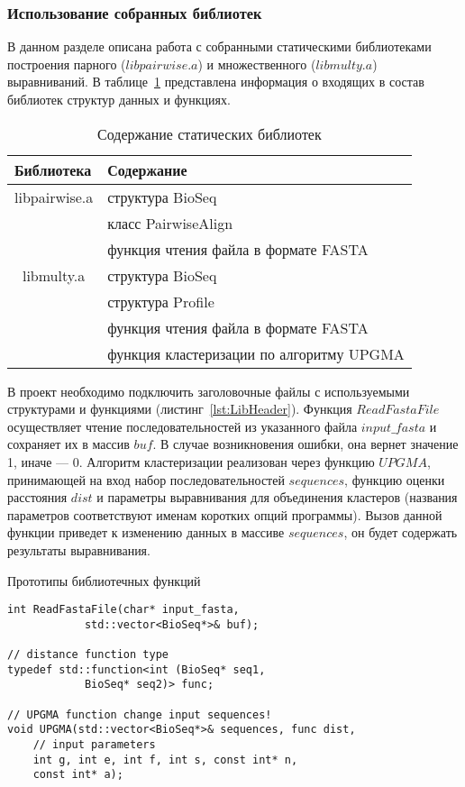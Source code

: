\subsubsection[Использование собранных библиотек]{\large Использование собранных библиотек}
\hspace{\parindent} В данном разделе описана работа с собранными статическими библиотеками построения парного ($libpairwise.a$) и множественного ($libmulty.a$) выравниваний. В таблице~\ref{tabular:staticlibs} представлена информация о входящих в состав библиотек структур данных и функциях.

\begin{table}[h]
\caption{Содержание статических библиотек}
\centering
\begin{tabular}{|l|l|}
\hline
Библиотека & Содержание \\ \hline
\multicolumn{ 1}{|c|}{libpairwise.a} & структура BioSeq \\ \cline{ 2- 2}
\multicolumn{ 1}{|l|}{} & класс PairwiseAlign \\ \cline{ 2- 2}
\multicolumn{ 1}{|l|}{} & функция чтения файла в формате FASTA \\ \hline
\multicolumn{ 1}{|c|}{libmulty.a} & структура BioSeq \\ \cline{ 2- 2}
\multicolumn{ 1}{|l|}{} & структура Profile \\ \cline{ 2- 2}
\multicolumn{ 1}{|l|}{} & функция чтения файла в формате FASTA \\ \cline{ 2- 2}
\multicolumn{ 1}{|l|}{} & функция кластеризации по алгоритму UPGMA \\ \hline
\end{tabular}
\label{tabular:staticlibs}
\end{table}

В проект необходимо подключить заголовочные файлы с используемыми структурами и функциями (листинг~\ref{lst:LibHeader}). Функция $ReadFastaFile$ осуществляет чтение последовательностей из указанного файла $input\_fasta$ и сохраняет их в массив $buf$. В случае возникновения ошибки, она вернет значение 1, иначе --- 0. Алгоритм кластеризации реализован через функцию $UPGMA$, принимающей на вход набор последовательностей $sequences$, функцию оценки расстояния $dist$ и параметры выравнивания для объединения кластеров (названия параметров соответствуют именам коротких опций программы). Вызов данной функции приведет к изменению данных в массиве $sequences$, он будет содержать результаты выравнивания.

\begin{algorithm}
	\caption{Прототипы библиотечных функций} \label{lst:LibHeader}
	\begin{lstlisting}
int ReadFastaFile(char* input_fasta, 
			std::vector<BioSeq*>& buf);
			
// distance function type
typedef std::function<int (BioSeq* seq1, 
			BioSeq* seq2)> func;
			
// UPGMA function change input sequences!
void UPGMA(std::vector<BioSeq*>& sequences, func dist, 
	// input parameters
	int g, int e, int f, int s, const int* n, 
	const int* a);
	\end{lstlisting}
\end{algorithm}

